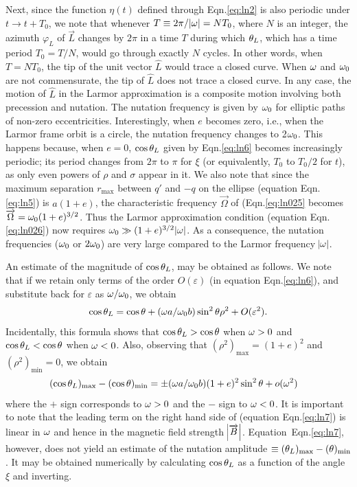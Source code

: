 \noindent Next, since the function $\eta(t)$ defined through 
Eqn.\eqref{eq:ln2} is also periodic under $t \rightarrow t + 
T_{0}$, we note that whenever $T \equiv 2 \pi /\abs{{\omega}} = 
NT_{0}$, where $N$ is an integer, the azimuth $\varphi_{L}$ 
of $\vec{L}$ changes by $2\pi$ in a time $T$ during which 
${\theta}_{L}$, which has a time period $T_0 = T/N$, would go 
through exactly $N$ cycles. In other words, when $T = 
NT_{0}$, the tip of the unit vector $\hat{L}$ would trace a 
closed curve. When ${\omega}$ and ${\omega}_{0}$ are not 
commensurate, the tip of $\hat{L}$ does not trace a closed 
curve. In any case, the motion of $\hat{L}$ in the Larmor 
approximation is a composite motion involving both 
precession and nutation. The nutation frequency is given by 
${\omega}_{0}$ for elliptic paths of non-zero eccentricities. 
Interestingly, when $e$ becomes zero, i.e., when the Larmor 
frame orbit is a circle, the nutation frequency changes to 
2${\omega}_{0}$. This happens because, when $e = 0$, $\cos 
{\theta}_{L}$ given by Eqn.\eqref{eq:ln6} becomes increasingly 
periodic; its period changes from $2\pi$ to $\pi$ for $\xi$ 
(or equivalently, $T_{0}$ to $T_{0}/2$ for $t$), as only 
even powers of $\rho$ and $\sigma$ appear in it. We also 
note that since the maximum separation $r_{\max}$ between 
$q'$ and $-q$ on the ellipse (equation Eqn.\eqref{eq:ln5}) 
is $a(1+e)$, the characteristic frequency $\vec{\Omega}$ of 
(Eqn.\eqref{eq:ln025} becomes $\overrightarrow{\Omega} = {\omega}_{0}(1 + 
e)^{3/2}$. Thus the Larmor approximation condition (equation 
Eqn.\eqref{eq:ln026}) now requires ${\omega}_{0} \gg 
(1+e)^{3/2}\abs{{\omega}}$. As a consequence, the nutation 
frequencies (${\omega}_{0}$ or $2{\omega}_{0}$) are very large 
compared to the Larmor frequency $\abs{{\omega}}$.

An estimate of the magnitude of $\cos {\theta}_{L}$, may be 
obtained as follows. We note that if we retain only terms of 
the order $O(\varepsilon)$ (in equation Eqn.\eqref{eq:ln6}), 
and substitute back for $\varepsilon$ as ${\omega}/{\omega}_{0}$, we 
obtain 
\begin{align*}
\cos {\theta}_{L} = \cos {\theta} + ({\omega} a / {\omega}_{0} b) 
\sin^{2}{\theta} \rho^{2} + O(\varepsilon^{2}).        
\end{align*}
Incidentally, this formula shows that $\cos {\theta}_{L} > \cos 
{\theta}$ when ${\omega} > 0 $ and $\cos {\theta}_{L} < \cos {\theta} $ when 
${\omega} < 0 $. Also, observing that $(\rho^{2})_{\max} = (1 + 
e)^2 $ and $(\rho^{2})_{\min} = 0$, we obtain
\begin{align}
& (\cos{\theta}_L)_{\max} - (\cos {\theta})_{\min}  =
  \pm ({\omega} a/ {\omega}_{0}b)
  (1+e)^{2} \sin^{2} {\theta} + o({\omega}^2)
\label{eq:ln7}
\end{align}
where the $+$ sign corresponds to ${\omega} > 0$ and the $-$ 
sign to ${\omega} < 0$. It is important to note that the leading 
term on the right hand side of (equation Eqn.\eqref{eq:ln7}) 
is linear in ${\omega}$ and hence in the magnetic field strength 
$\abs{\overrightarrow{B}}$. Equation~Eqn.\eqref{eq:ln7}, however, does 
not yield an estimate of the nutation amplitude $\equiv 
({\theta}_{L})_{\max} - ({\theta})_{\min}$. It may be obtained 
numerically by calculating $\cos {\theta}_{L}$ as a function of 
the angle $\xi$ and inverting.
